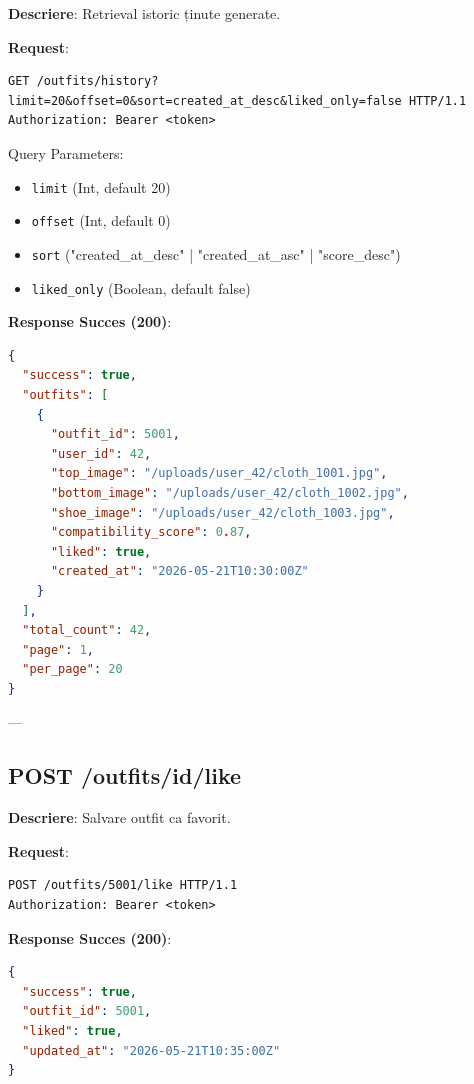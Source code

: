 \textbf{Descriere}: Retrieval istoric ținute generate.

\textbf{Request}:

\begin{lstlisting}[language=HTTP]
GET /outfits/history?limit=20&offset=0&sort=created_at_desc&liked_only=false HTTP/1.1
Authorization: Bearer <token>
\end{lstlisting}

Query Parameters:
\begin{itemize}
    \item \texttt{limit} (Int, default 20)
    \item \texttt{offset} (Int, default 0)
    \item \texttt{sort} ("created_at\_desc" | "created_at_asc" | "score_desc")
    \item \texttt{liked\_only} (Boolean, default false)
\end{itemize}

\textbf{Response Succes (200)}:

\begin{lstlisting}[language=JSON]
{
  "success": true,
  "outfits": [
    {
      "outfit_id": 5001,
      "user_id": 42,
      "top_image": "/uploads/user_42/cloth_1001.jpg",
      "bottom_image": "/uploads/user_42/cloth_1002.jpg",
      "shoe_image": "/uploads/user_42/cloth_1003.jpg",
      "compatibility_score": 0.87,
      "liked": true,
      "created_at": "2026-05-21T10:30:00Z"
    }
  ],
  "total_count": 42,
  "page": 1,
  "per_page": 20
}
\end{lstlisting}

---

\subsection{POST /outfits/{id}/like}

\textbf{Descriere}: Salvare outfit ca favorit.

\textbf{Request}:

\begin{lstlisting}[language=HTTP]
POST /outfits/5001/like HTTP/1.1
Authorization: Bearer <token>
\end{lstlisting}

\textbf{Response Succes (200)}:

\begin{lstlisting}[language=JSON]
{
  "success": true,
  "outfit_id": 5001,
  "liked": true,
  "updated_at": "2026-05-21T10:35:00Z"
}
\end{lstlisting}

